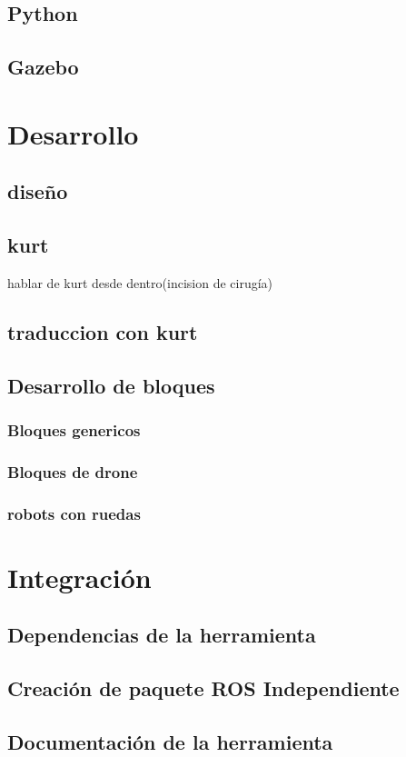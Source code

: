 \documentclass{article}
\begin{document}
    \subsection{Python}
    \subsection{Gazebo}
\section{Desarrollo}
    \subsection{diseño}	
    \subsection{kurt}
hablar de kurt desde dentro(incision de cirugía)
    \subsection{traduccion con kurt}		
    \subsection{Desarrollo de bloques}
        \subsubsection{Bloques genericos}
        \subsubsection{Bloques de drone}
	\subsubsection{robots con ruedas}
\section{Integración}
    \subsection{Dependencias de la herramienta}
    \subsection{Creación de paquete ROS Independiente}
    \subsection{Documentación de la herramienta}
\end{document}
